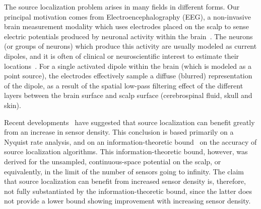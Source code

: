 \documentclass[conference]{IEEEtran}
\begin{document}


The source localization problem arises in many fields in different forms. Our
principal motivation comes from Electroencephalography (EEG), a non-invasive
brain measurement modality which uses electrodes placed on the scalp to sense
electric potentials produced by neuronal activity within the
brain~\cite{Nunez2006Electric}. The neurons (or groups of neurons) which
produce this activity are usually modeled as current dipoles, and it is often
of clinical or neuroscientific interest to estimate their
locations~\cite{Baillet2001Electromagnetic}. For a single activated dipole
within the brain (which is modeled as a point source), the electrodes
effectively sample a diffuse (blurred) representation of the dipole, as a
result of the spatial low-pass filtering effect of the different layers between
the brain surface and scalp surface (cerebrospinal fluid, skull and skin).

Recent developments~\cite{Grover2016Information} have suggested that source
localization can benefit greatly from an increase in sensor density. This
conclusion is based primarily on a Nyquist rate analysis, and on an
information-theoretic bound~\cite{Grover2016Fundamental} on the accuracy of
source localization algorithms. This information-theoretic bound, however, was
derived for the unsampled, continuous-space potential on the scalp, or
equivalently, in the limit of the number of sensors going to infinity. The
claim that source localization can benefit from increased sensor density is,
therefore, not fully substantiated by the information-theoretic bound, since
the latter does not provide a lower bound showing improvement with increasing
sensor density.
\end{document}
